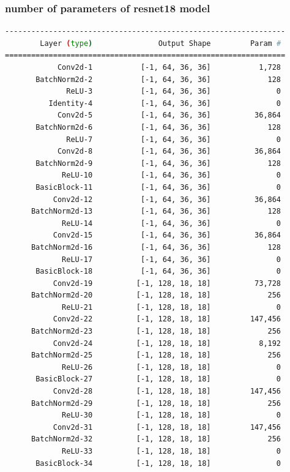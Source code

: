 \documentclass[a4paper, 12pt]{article}
\begin{document}
\subsubsection{number of parameters of resnet18 model}
\begin{lstlisting}[language=sh]
----------------------------------------------------------------
        Layer (type)               Output Shape         Param #
================================================================
            Conv2d-1           [-1, 64, 36, 36]           1,728
       BatchNorm2d-2           [-1, 64, 36, 36]             128
              ReLU-3           [-1, 64, 36, 36]               0
          Identity-4           [-1, 64, 36, 36]               0
            Conv2d-5           [-1, 64, 36, 36]          36,864
       BatchNorm2d-6           [-1, 64, 36, 36]             128
              ReLU-7           [-1, 64, 36, 36]               0
            Conv2d-8           [-1, 64, 36, 36]          36,864
       BatchNorm2d-9           [-1, 64, 36, 36]             128
             ReLU-10           [-1, 64, 36, 36]               0
       BasicBlock-11           [-1, 64, 36, 36]               0
           Conv2d-12           [-1, 64, 36, 36]          36,864
      BatchNorm2d-13           [-1, 64, 36, 36]             128
             ReLU-14           [-1, 64, 36, 36]               0
           Conv2d-15           [-1, 64, 36, 36]          36,864
      BatchNorm2d-16           [-1, 64, 36, 36]             128
             ReLU-17           [-1, 64, 36, 36]               0
       BasicBlock-18           [-1, 64, 36, 36]               0
           Conv2d-19          [-1, 128, 18, 18]          73,728
      BatchNorm2d-20          [-1, 128, 18, 18]             256
             ReLU-21          [-1, 128, 18, 18]               0
           Conv2d-22          [-1, 128, 18, 18]         147,456
      BatchNorm2d-23          [-1, 128, 18, 18]             256
           Conv2d-24          [-1, 128, 18, 18]           8,192
      BatchNorm2d-25          [-1, 128, 18, 18]             256
             ReLU-26          [-1, 128, 18, 18]               0
       BasicBlock-27          [-1, 128, 18, 18]               0
           Conv2d-28          [-1, 128, 18, 18]         147,456
      BatchNorm2d-29          [-1, 128, 18, 18]             256
             ReLU-30          [-1, 128, 18, 18]               0
           Conv2d-31          [-1, 128, 18, 18]         147,456
      BatchNorm2d-32          [-1, 128, 18, 18]             256
             ReLU-33          [-1, 128, 18, 18]               0
       BasicBlock-34          [-1, 128, 18, 18]               0

\end{lstlisting}
\end{document}
